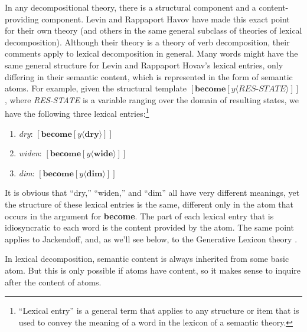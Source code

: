 In any decompositional theory, there is a structural component and a content-providing component. Levin and Rappaport Havov \cite{levin_lexical_2008} have made this exact point for their own theory (and others in the same general subclass of theories of lexical decomposition). Although their theory is a theory of verb decomposition, their comments apply to lexical decomposition in general. Many words might have the same general structure for Levin and Rappaport Hovav's lexical entries, only differing in their semantic content, which is represented in the form of semantic atoms. For example, given the structural template $[\textbf{become}[y\langle\textit{RES-STATE}\rangle]]$, where \emph{RES-STATE} is a variable ranging over the domain of resulting states, we have the following three lexical entries:\footnote{``Lexical entry'' is a general term that applies to any structure or item that is used to convey the meaning of a word in the lexicon of a semantic theory.}
\begin{enumerate}
\item \emph{dry}: $[\textbf{become}[y\langle\textbf{dry}\rangle]]$
\item \emph{widen}: $[\textbf{become}[y\langle\textbf{wide}\rangle]]$
\item \emph {dim}: $[\textbf{become}[y\langle\textbf{dim}\rangle]]$
\end{enumerate}
It is obvious that ``dry,'' ``widen,'' and ``dim'' all have very different meanings, yet the structure of these lexical entries is the same, different only in the atom that occurs in the argument for {\bf become}. The part of each lexical entry that is idiosyncratic to each word is the content provided by the atom. The same point applies to Jackendoff, and, as we'll see below, to the Generative Lexicon theory \cite{pustejovsky_generative_1998}.

In lexical decomposition, semantic content is always inherited from some basic atom. But this is only possible if atoms have content, so it makes sense to inquire after the content of atoms. 

